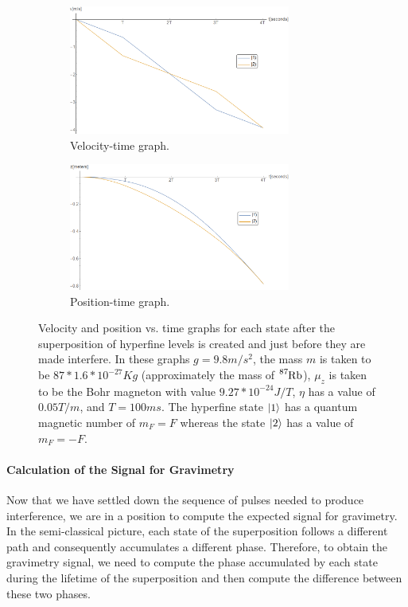 \documentclass{article}
\begin{document}
\begin{figure}
    \centering
    \begin{subfigure}{1\textwidth}
        \centering
        \includegraphics[width=0.8\textwidth]{velocidad.png}
        \caption{Velocity-time graph.}
        \label{velocity_graph}
    \end{subfigure}
    \hfill
    \begin{subfigure}{1\textwidth}
        \centering
        \includegraphics[width=0.8\textwidth]{posicion.png}
        \caption{Position-time graph.}
        \label{position_graph}
    \end{subfigure}
    \caption{Velocity and position vs. time graphs for each state after the superposition of hyperfine levels is created and just before they are made interfere. In these graphs $g=9.8m/s^2$, the mass $m$ is taken to be $87*1.6*10^{-27} Kg$ (approximately the mass of $\ce{^{87}_{}Rb}$), $\mu_{z}$ is taken to be the Bohr magneton with value $9.27*10^{-24} J/T$, $\eta$ has a value of $0.05 T/m$, and $T=100ms$. 
    The hyperfine state $\ket{1}$ has a quantum magnetic number of $m_{F}=F$ whereas the state $\ket{2}$ has a value of $m_{F}=-F$.}
    \label{velocity_position_graphs}
\end{figure}

\paragraph{Calculation of the Signal for Gravimetry}
Now that we have settled down the sequence of pulses needed to produce interference, we are in a position to compute the expected signal for gravimetry. In the semi-classical picture, each state of the superposition follows a different path and consequently accumulates a different phase. Therefore, to obtain the gravimetry signal, we need to compute the phase accumulated by each state during the lifetime of the superposition and then compute the difference between these two phases. 
\end{document}
